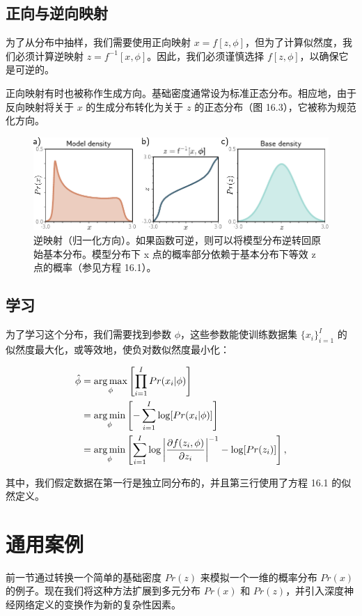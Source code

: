 \documentclass[lang=cn,newtx,10pt,scheme=chinese]{elegantbook}
\begin{document}
\subsection{正向与逆向映射}
为了从分布中抽样，我们需要使用正向映射 \(x = f[z, \phi]\)，但为了计算似然度，我们必须计算逆映射 \(z = f^{-1}[x, \phi]\)。因此，我们必须谨慎选择 \(f[z, \phi]\)，以确保它是可逆的。

正向映射有时也被称作生成方向。基础密度通常设为标准正态分布。相应地，由于反向映射将关于 \(x\) 的生成分布转化为关于 \(z\) 的正态分布（图 16.3），它被称为规范化方向。

\begin{figure}[ht!]
\centering
\includegraphics[width=0.7\linewidth]{PDFFigures/UDLChap16PDF/FlowIntroInverse.pdf}
\caption{逆映射（归一化方向）。如果函数可逆，则可以将模型分布逆转回原始基本分布。模型分布下 x 点的概率部分依赖于基本分布下等效 z 点的概率（参见方程 16.1）。}
\end{figure}


\subsection{学习}

为了学习这个分布，我们需要找到参数 \(\phi\)，这些参数能使训练数据集 \(\{x_i\}_{i=1}^I\) 的似然度最大化，或等效地，使负对数似然度最小化：


\begin{align}
\hat{\phi} &= \underset{\phi}{\arg\max} \left[ \prod_{i=1}^I Pr(x_i|\phi) \right] \notag \\
&= \underset{\phi}{\arg\min} \left[ -\sum_{i=1}^I \log[Pr(x_i|\phi)] \right] \notag \\
&= \underset{\phi}{\arg\min} \left[ \sum_{i=1}^I \log \left| \frac{\partial f(z_i, \phi)}{\partial z_i} \right|^{-1} - \log[Pr(z_i)] \right], 
\end{align} 


其中，我们假定数据在第一行是独立同分布的，并且第三行使用了方程 16.1 的似然定义。


\section{通用案例}
前一节通过转换一个简单的基础密度 \(Pr(z)\) 来模拟一个一维的概率分布 \(Pr(x)\) 的例子。现在我们将这种方法扩展到多元分布 \(Pr(x)\) 和 \(Pr(z)\)，并引入深度神经网络定义的变换作为新的复杂性因素。
\end{document}
